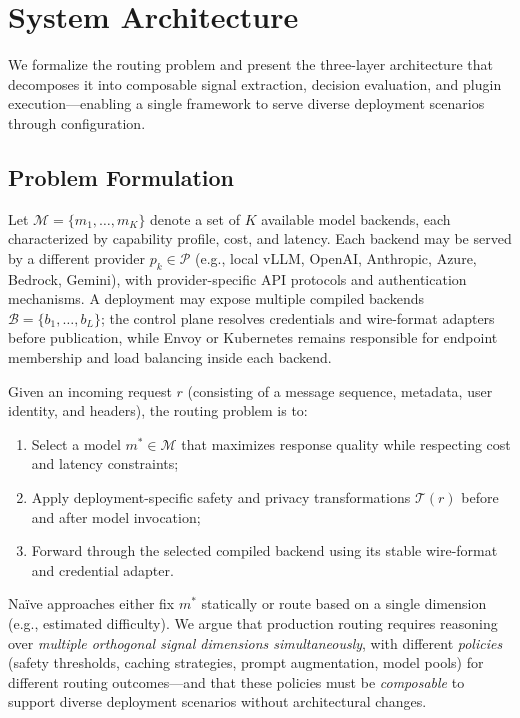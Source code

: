 
\section{System Architecture}
\label{sec:architecture}

We formalize the routing problem and present the three-layer architecture that decomposes it into composable signal extraction, decision evaluation, and plugin execution---enabling a single framework to serve diverse deployment scenarios through configuration.

\subsection{Problem Formulation}

Let $\mathcal{M} = \{m_1, \ldots, m_K\}$ denote a set of $K$ available model backends, each characterized by capability profile, cost, and latency.
Each backend may be served by a different provider $p_k \in \mathcal{P}$ (e.g., local vLLM, OpenAI, Anthropic, Azure, Bedrock, Gemini), with provider-specific API protocols and authentication mechanisms.
A deployment may expose multiple compiled backends $\mathcal{B} = \{b_1, \ldots, b_L\}$; the control plane resolves credentials and wire-format adapters before publication, while Envoy or Kubernetes remains responsible for endpoint membership and load balancing inside each backend.

Given an incoming request $r$ (consisting of a message sequence, metadata, user identity, and headers), the routing problem is to:
\begin{enumerate}[leftmargin=*]
  \item Select a model $m^* \in \mathcal{M}$ that maximizes response quality while respecting cost and latency constraints;
  \item Apply deployment-specific safety and privacy transformations $\mathcal{T}(r)$ before and after model invocation;
  \item Forward through the selected compiled backend using its stable wire-format and credential adapter.
\end{enumerate}

Na\"ive approaches either fix $m^*$ statically or route based on a single dimension (e.g., estimated difficulty).
We argue that production routing requires reasoning over \emph{multiple orthogonal signal dimensions simultaneously}, with different \emph{policies} (safety thresholds, caching strategies, prompt augmentation, model pools) for different routing outcomes---and that these policies must be \emph{composable} to support diverse deployment scenarios without architectural changes.


